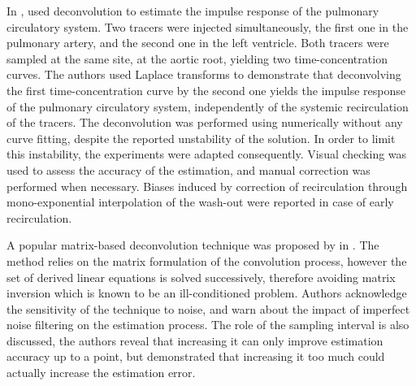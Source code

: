 In \citeyear{Maseri:1970gn}, \citet{Maseri:1970gn} used deconvolution to estimate the impulse response of the pulmonary circulatory system.
Two tracers were injected simultaneously, the first one in the pulmonary artery, and the second one in the left ventricle.
Both tracers were sampled at the same site, at the aortic root, yielding two time-concentration curves. 
The authors used Laplace transforms to demonstrate that deconvolving the first time-concentration curve by the second one yields the impulse response of the pulmonary circulatory system, independently of the systemic recirculation of the tracers. 
The deconvolution was performed using numerically without any curve fitting, despite the reported unstability of the solution.
In order to limit this instability, the experiments were adapted consequently. 
Visual checking was used to assess the accuracy of the estimation, and manual correction was performed when necessary.
Biases induced by correction of recirculation through mono-exponential interpolation of the wash-out were reported in case of early recirculation.

A popular matrix-based deconvolution technique was proposed by \citet{Valentinuzzi:1975tr} in \citeyear{Valentinuzzi:1975tr}. 
The method relies on the matrix formulation of the convolution process, however the set of derived linear equations is solved successively, therefore avoiding matrix inversion which is known to be an ill-conditioned problem. 
Authors acknowledge the sensitivity of the technique to noise, and warn about the impact of imperfect noise filtering on the estimation process. 
The role of the sampling interval is also discussed, the authors reveal that increasing it can only improve estimation accuracy up to a point, but demonstrated that increasing it too much could actually increase the estimation error.

